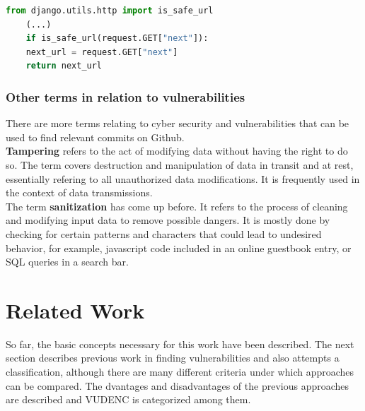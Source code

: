 \documentclass[
a4paper,
pagesize,
pdftex,
12pt,
twoside, %
BCOR=5mm, %
ngerman,
fleqn,
final,
]{scrartcl}
\begin{document}
	\begin{lstlisting}[language=Python, showstringspaces=False]
	from django.utils.http import is_safe_url
	(...)
	if is_safe_url(request.GET["next"]):
	next_url = request.GET["next"]
	return next_url
	\end{lstlisting}
	
	
	\subsubsection{Other terms in relation to vulnerabilities}
	There are more terms relating to cyber security and vulnerabilities that can be used to find relevant commits on Github.\\
	\textbf{Tampering} refers to the act of modifying data without having the right to do so. The term covers destruction and manipulation of data in transit and at rest, essentially refering to all unauthorized data modifications. It is frequently used in the context of data transmissions.\\
	The term \textbf{sanitization} has come up before. It refers to the process of cleaning and modifying input data to remove possible dangers. It is mostly done by checking for certain patterns and characters that could lead to undesired behavior, for example, javascript code included in an online guestbook entry, or SQL queries in a search bar.\\
	
	\newpage

	\section{Related Work}\label{Related-Work}
	
	So far, the basic concepts necessary for this work have been described. The next section describes previous work in finding vulnerabilities and also attempts a classification, although there are many different criteria under which approaches can be compared. The dvantages and disadvantages of the previous approaches are described and VUDENC is categorized among them.
	
\end{document}
